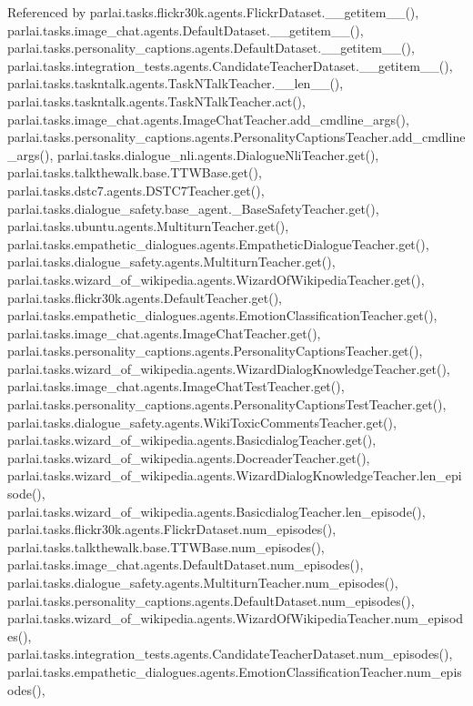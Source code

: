 Referenced by parlai.\+tasks.\+flickr30k.\+agents.\+Flickr\+Dataset.\+\_\+\+\_\+getitem\+\_\+\+\_\+(), parlai.\+tasks.\+image\+\_\+chat.\+agents.\+Default\+Dataset.\+\_\+\+\_\+getitem\+\_\+\+\_\+(), parlai.\+tasks.\+personality\+\_\+captions.\+agents.\+Default\+Dataset.\+\_\+\+\_\+getitem\+\_\+\+\_\+(), parlai.\+tasks.\+integration\+\_\+tests.\+agents.\+Candidate\+Teacher\+Dataset.\+\_\+\+\_\+getitem\+\_\+\+\_\+(), parlai.\+tasks.\+taskntalk.\+agents.\+Task\+N\+Talk\+Teacher.\+\_\+\+\_\+len\+\_\+\+\_\+(), parlai.\+tasks.\+taskntalk.\+agents.\+Task\+N\+Talk\+Teacher.\+act(), parlai.\+tasks.\+image\+\_\+chat.\+agents.\+Image\+Chat\+Teacher.\+add\+\_\+cmdline\+\_\+args(), parlai.\+tasks.\+personality\+\_\+captions.\+agents.\+Personality\+Captions\+Teacher.\+add\+\_\+cmdline\+\_\+args(), parlai.\+tasks.\+dialogue\+\_\+nli.\+agents.\+Dialogue\+Nli\+Teacher.\+get(), parlai.\+tasks.\+talkthewalk.\+base.\+T\+T\+W\+Base.\+get(), parlai.\+tasks.\+dstc7.\+agents.\+D\+S\+T\+C7\+Teacher.\+get(), parlai.\+tasks.\+dialogue\+\_\+safety.\+base\+\_\+agent.\+\_\+\+Base\+Safety\+Teacher.\+get(), parlai.\+tasks.\+ubuntu.\+agents.\+Multiturn\+Teacher.\+get(), parlai.\+tasks.\+empathetic\+\_\+dialogues.\+agents.\+Empathetic\+Dialogue\+Teacher.\+get(), parlai.\+tasks.\+dialogue\+\_\+safety.\+agents.\+Multiturn\+Teacher.\+get(), parlai.\+tasks.\+wizard\+\_\+of\+\_\+wikipedia.\+agents.\+Wizard\+Of\+Wikipedia\+Teacher.\+get(), parlai.\+tasks.\+flickr30k.\+agents.\+Default\+Teacher.\+get(), parlai.\+tasks.\+empathetic\+\_\+dialogues.\+agents.\+Emotion\+Classification\+Teacher.\+get(), parlai.\+tasks.\+image\+\_\+chat.\+agents.\+Image\+Chat\+Teacher.\+get(), parlai.\+tasks.\+personality\+\_\+captions.\+agents.\+Personality\+Captions\+Teacher.\+get(), parlai.\+tasks.\+wizard\+\_\+of\+\_\+wikipedia.\+agents.\+Wizard\+Dialog\+Knowledge\+Teacher.\+get(), parlai.\+tasks.\+image\+\_\+chat.\+agents.\+Image\+Chat\+Test\+Teacher.\+get(), parlai.\+tasks.\+personality\+\_\+captions.\+agents.\+Personality\+Captions\+Test\+Teacher.\+get(), parlai.\+tasks.\+dialogue\+\_\+safety.\+agents.\+Wiki\+Toxic\+Comments\+Teacher.\+get(), parlai.\+tasks.\+wizard\+\_\+of\+\_\+wikipedia.\+agents.\+Basicdialog\+Teacher.\+get(), parlai.\+tasks.\+wizard\+\_\+of\+\_\+wikipedia.\+agents.\+Docreader\+Teacher.\+get(), parlai.\+tasks.\+wizard\+\_\+of\+\_\+wikipedia.\+agents.\+Wizard\+Dialog\+Knowledge\+Teacher.\+len\+\_\+episode(), parlai.\+tasks.\+wizard\+\_\+of\+\_\+wikipedia.\+agents.\+Basicdialog\+Teacher.\+len\+\_\+episode(), parlai.\+tasks.\+flickr30k.\+agents.\+Flickr\+Dataset.\+num\+\_\+episodes(), parlai.\+tasks.\+talkthewalk.\+base.\+T\+T\+W\+Base.\+num\+\_\+episodes(), parlai.\+tasks.\+image\+\_\+chat.\+agents.\+Default\+Dataset.\+num\+\_\+episodes(), parlai.\+tasks.\+dialogue\+\_\+safety.\+agents.\+Multiturn\+Teacher.\+num\+\_\+episodes(), parlai.\+tasks.\+personality\+\_\+captions.\+agents.\+Default\+Dataset.\+num\+\_\+episodes(), parlai.\+tasks.\+wizard\+\_\+of\+\_\+wikipedia.\+agents.\+Wizard\+Of\+Wikipedia\+Teacher.\+num\+\_\+episodes(), parlai.\+tasks.\+integration\+\_\+tests.\+agents.\+Candidate\+Teacher\+Dataset.\+num\+\_\+episodes(), parlai.\+tasks.\+empathetic\+\_\+dialogues.\+agents.\+Emotion\+Classification\+Teacher.\+num\+\_\+episodes(), 